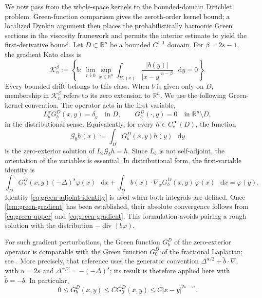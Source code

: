 \documentclass[reqno]{amsart}
\numberwithin{equation}{section}
\theoremstyle{plain}
\theoremstyle{definition}
\theoremstyle{remark}
\newcommand{\R}{\mathbb R}
\newcommand{\differential}{\mathop{}\!\mathrm d}
\DeclareMathOperator{\divergence}{div}
\newcommand{\Lb}{L_b}
\newcommand{\rev}[1]{#1}
\begin{document}
\rev{We now pass from the whole-space kernels to the bounded-domain
Dirichlet problem.  Green-function comparison gives the zeroth-order
kernel bound; a localized Dynkin argument then places the probabilistically
harmonic Green sections in the viscosity framework and permits the interior
estimate to yield the first-derivative bound.}  Let $D\subset\R^n$ be a
bounded $C^{1,1}$ domain.  For $\beta=2s-1$, the gradient Kato class is
\begin{equation}\label{eq:kato-measure-section}
 \mathcal K_n^{\beta}
 :=\left\{b:\ \lim_{r\downarrow0}\sup_{x\in\R^n}
 \int_{B_r(x)}\frac{|b(y)|}{|x-y|^{n-\beta}}\,\differential y=0\right\}.
\end{equation}
Every bounded drift belongs to this class.  When $b$ is given only on $D$,
membership in $\mathcal K_n^\beta$ refers to its zero extension to $\R^n$.
We use the following Green-kernel convention.  The operator acts in the
first variable,
\[
 \Lb^xG_b^D(x,y)=\delta_y\quad\text{in }D,
 \qquad G_b^D(\cdot,y)=0\quad\text{in }\R^n\setminus D,
\]
in the distributional sense.  Equivalently, for every
$h\in C_c^\infty(D)$, the function
\[
 \mathcal G_bh(x):=\int_DG_b^D(x,y)h(y)\,\differential y
\]
is the zero-exterior solution of $\Lb\mathcal G_bh=h$.  Since $\Lb$ is not
self-adjoint, the orientation of the variables is essential.  In
distributional form, the first-variable identity is
\begin{equation}\label{eq:green-adjoint-identity}
 \int_D G_b^D(x,y)(-\Delta)^s\varphi(x)\,\differential x
 +\int_D b(x)\cdot\nabla_xG_b^D(x,y)\,\varphi(x)\,\differential x
 =\varphi(y).
\end{equation}
\rev{Identity \eqref{eq:green-adjoint-identity} is used when both integrals
are defined.  Once \cref{lem:green-gradient} has been established, their
absolute convergence follows from \eqref{eq:green-upper} and
\eqref{eq:green-gradient}.}  This
formulation avoids pairing a rough solution with the distribution
$-\divergence(b\varphi)$.

For such gradient perturbations,
the Green function $G_b^D$ of the zero-exterior operator is comparable with
the Green function $G_0^D$ of the fractional Laplacian; see
\cite{BogdanJakubowski2012}.  \rev{More precisely, that reference uses the
generator convention $\Delta^{\alpha/2}+\widetilde b\cdot\nabla$, with
$\alpha=2s$ and $\Delta^{\alpha/2}=-(-\Delta)^s$; its result is therefore
applied here with $\widetilde b=-b$.}  In particular,
\begin{equation}\label{eq:green-upper}
 0\le G_b^D(x,y)\le C G_0^D(x,y)
 \le C|x-y|^{2s-n}.
\end{equation}
\end{document}
